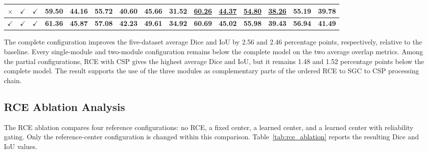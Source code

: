 \documentclass[a4paper,fleqn]{cas-sc}
\begin{document}
\begin{table}[pos=!htbp]
\begin{adjustbox}{max width=\textwidth,center}
\begin{tabular}{ccccccccccccccc}
$\times$ & $\checkmark$ & $\checkmark$
& 59.50 & 44.16
& 55.72 & 40.60
& 45.66 & 31.52
& \underline{60.26} & \underline{44.37}
& \underline{54.80} & \underline{38.26}
& 55.19 & 39.78 \\
\midrule
$\checkmark$ & $\checkmark$ & $\checkmark$
& \textbf{61.36} & \textbf{45.87}
& \textbf{57.08} & \textbf{42.23}
& \textbf{49.61} & \textbf{34.92}
& \textbf{60.69} & \textbf{45.02}
& \textbf{55.98} & \textbf{39.43}
& \textbf{56.94} & \textbf{41.49} \\
\bottomrule
\end{tabular}
\end{adjustbox}
\end{table}

The complete configuration improves the five-dataset average Dice and IoU by 2.56 and 2.46 percentage points, respectively, relative to the baseline.
Every single-module and two-module configuration remains below the complete model on the two average overlap metrics.
Among the partial configurations, RCE with CSP gives the highest average Dice and IoU, but it remains 1.48 and 1.52 percentage points below the complete model.
The result supports the use of the three modules as complementary parts of the ordered RCE to SGC to CSP processing chain.

\subsection{RCE Ablation Analysis}

The RCE ablation compares four reference configurations: no RCE, a fixed center, a learned center, and a learned center with reliability gating.
Only the reference-center configuration is changed within this comparison.
Table~\ref{tab:rce_ablation} reports the resulting Dice and IoU values.
\end{document}
